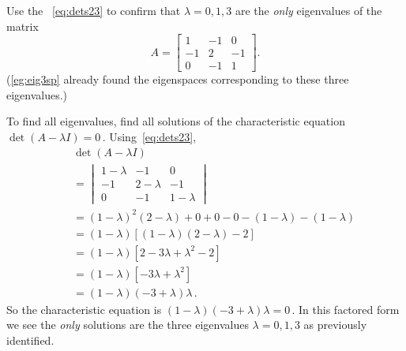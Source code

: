 \begin{example} \label{eg:eig3introval}
Use the ~\eqref{eq:dets23} to confirm that \(\lambda=0,1,3\) are the \emph{only} eigenvalues of the matrix
\begin{equation*}
A=\begin{bmatrix} 1&-1&0\\-1&2&-1\\0&-1&1 \end{bmatrix}.
\end{equation*}
(\cref{eg:eig3sp} already found the eigenspaces corresponding to these three eigenvalues.)
\begin{solution} 
To find all eigenvalues, find all solutions of the characteristic equation \(\det(A-\lambda I)=0\)\,.  
Using~\eqref{eq:dets23},
\begin{eqnarray*}
&&\det(A-\lambda I)
\\&&{}=\begin{vmatrix} 1-\lambda&-1&0\\-1&2-\lambda&-1\\0&-1&1-\lambda \end{vmatrix}
\\&&{}=(1-\lambda)^2(2-\lambda)+0+0-0-(1-\lambda)-(1-\lambda)
\\&&{}=(1-\lambda)\left[(1-\lambda)(2-\lambda)-2\right]
\\&&{}=(1-\lambda)\left[2-3\lambda+\lambda^2-2\right]
\\&&{}=(1-\lambda)\left[-3\lambda+\lambda^2\right]
\\&&{}=(1-\lambda)(-3+\lambda)\lambda\,.
\end{eqnarray*}
So the characteristic equation is \((1-\lambda)(-3+\lambda)\lambda=0\)\,. 
In this factored form we see the \emph{only} solutions are the three eigenvalues \(\lambda=0,1,3\) as previously identified.
\end{solution}
\end{example}



